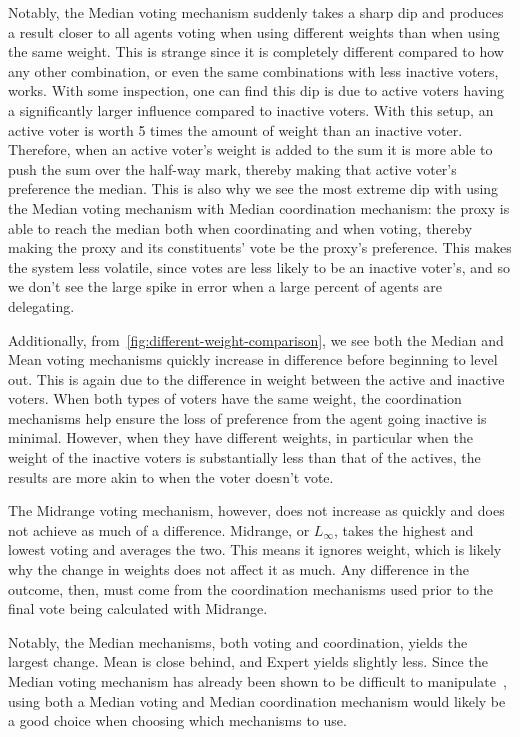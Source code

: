 Notably, the Median voting mechanism suddenly takes a sharp dip and produces a result
closer to all agents voting when using different weights than when using the same
weight.
This is strange since it is completely different compared to how any other
combination, or even the same combinations with less inactive voters, works.
With some inspection, one can find this dip is due to active voters having a
significantly larger influence compared to inactive voters.
With this setup, an active voter is worth 5 times the amount of weight than an
inactive voter.
Therefore, when an active voter's weight is added to the sum it is more able to push
the sum over the half-way mark, thereby making that active voter's preference the
median.
This is also why we see the most extreme dip with using the Median voting mechanism
with Median coordination mechanism: the proxy is able to reach the median both when
coordinating and when voting, thereby making the proxy and its constituents' vote be the
proxy's preference.
This makes the system less volatile, since votes are less likely to be an inactive
voter's, and so we don't see the large spike in error when a large percent of agents
are delegating.

Additionally, from~\autoref{fig:different-weight-comparison}, we see both the Median
and Mean voting mechanisms quickly increase
in difference before beginning to level out.
This is again due to the difference in weight between the active and inactive voters.
When both types of voters have the same weight, the coordination mechanisms help
ensure the loss of preference from the agent going inactive is minimal.
However, when they have different weights, in particular when the weight of the
inactive voters is substantially less than that of the actives, the results are more
akin to when the voter doesn't vote.

The Midrange voting mechanism, however, does not increase as quickly and does not
achieve as much of a difference.
Midrange, or $L_{\infty}$, takes the highest and lowest voting and averages the two.
This means it ignores weight, which is likely why the change in weights does not
affect it as much.
Any difference in the outcome, then, must come from the coordination mechanisms used
prior to the final vote being calculated with Midrange.

Notably, the Median mechanisms, both voting and coordination, yields the largest
change.
Mean is close behind, and Expert yields slightly less.
Since the Median voting mechanism has already been shown to be difficult to
manipulate~\cite{Moulin1980}, using both a Median voting and Median coordination
mechanism would likely be a good choice when choosing which mechanisms to use.

